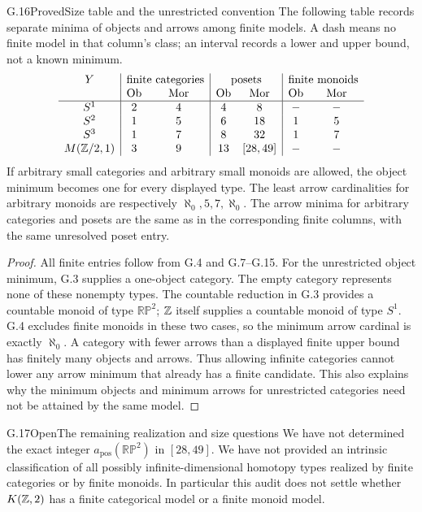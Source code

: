 \begin{claim}{G.16}{Proved}{Size table and the unrestricted convention}
The following table records separate minima of objects and arrows among finite models. A dash means no finite model in that column's class; an interval records a lower and upper bound, not a known minimum.
\[
\begin{array}{c|cc|cc|cc}
Y&\multicolumn{2}{c|}{\text{finite categories}}&\multicolumn{2}{c|}{\text{posets}}&\multicolumn{2}{c}{\text{finite monoids}}\\
 &\Ob&\Mor&\Ob&\Mor&\Ob&\Mor\\ \hline
S^1&2&4&4&8&-&-\\
S^2&1&5&6&18&1&5\\
S^3&1&7&8&32&1&7\\
M(\Z/2,1)&3&9&13&[28,49]&-&-
\end{array}
\]
If arbitrary small categories and arbitrary small monoids are allowed, the object minimum becomes one for every displayed type. The least arrow cardinalities for arbitrary monoids are respectively $\aleph_0,5,7,\aleph_0$. The arrow minima for arbitrary categories and posets are the same as in the corresponding finite columns, with the same unresolved poset entry.
\end{claim}
\begin{proof}
All finite entries follow from G.4 and G.7--G.15. For the unrestricted object minimum, G.3 supplies a one-object category. The empty category represents none of these nonempty types. The countable reduction in G.3 provides a countable monoid of type $\mathbb{RP}^2$; $\mathbb Z$ itself supplies a countable monoid of type $S^1$. G.4 excludes finite monoids in these two cases, so the minimum arrow cardinal is exactly $\aleph_0$. A category with fewer arrows than a displayed finite upper bound has finitely many objects and arrows. Thus allowing infinite categories cannot lower any arrow minimum that already has a finite candidate. This also explains why the minimum objects and minimum arrows for unrestricted categories need not be attained by the same model.
\end{proof}

\begin{claim}{G.17}{Open}{The remaining realization and size questions}
We have not determined the exact integer $a_{\mathrm{pos}}(\mathbb{RP}^2)$ in $[28,49]$. We have not provided an intrinsic classification of all possibly infinite-dimensional homotopy types realized by finite categories or by finite monoids. In particular this audit does not settle whether $K(\mathbb Z,2)$ has a finite categorical model or a finite monoid model.
\end{claim}


